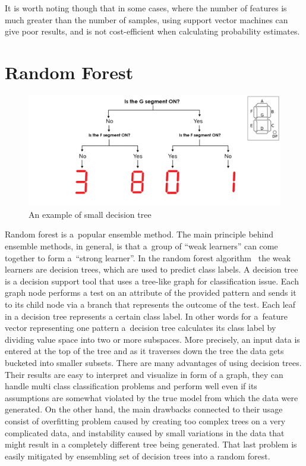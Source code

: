 It is worth noting though that in some cases, where the number of features is much greater than the number of samples, using support vector machines can give poor results, and is not cost-efficient when calculating probability estimates. 

\section{Random Forest}

\begin{figure}[htp]
	\centering
	\includegraphics[width=1.0\textwidth]{Figures/rf_visualization_funny.jpg}
	\caption{An example of small decision tree}
	\label{fig:rf_visualization_funny}\vspace{-3pt}
\end{figure}

Random forest is a~popular ensemble method. The main principle behind ensemble methods, in general, is that a~group of ``weak learners'' can come together to form a~``strong learner''. In the random forest algorithm~\cite{Breiman2001} the weak learners are decision trees, which are used to predict class labels. A decision tree is a decision support tool that uses a tree-like graph for classification issue. Each graph node performs a test on an attribute of the provided pattern and sends it to its child node via a branch that represents the outcome of the test. Each leaf in a decision tree represents a certain class label. In other words for a~feature vector representing one pattern a~decision tree calculates its class label by dividing value space into two or more subspaces. More precisely, an input data is entered at the top of the tree and as it traverses down the tree the data gets bucketed into smaller subsets. There are many advantages of using decision trees. Their results are easy to interpret and visualize in form of a graph, they can handle multi class classification problems and perform well even if its assumptions are somewhat violated by the true model from which the data were generated. On the other hand, the main drawbacks connected to their usage consist of overfitting problem caused by creating too complex trees on a very complicated data, and instability caused by small variations in the data that might result in a completely different tree being generated. That last problem is easily mitigated by ensembling set of decision trees into a random forest. 


